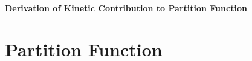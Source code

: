 \documentclass[10pt]{article}
\begin{document}
\begin{center}
  \large \bf Derivation of Kinetic Contribution to Partition Function
\end{center}

\section*{Partition Function}
\end{document}
